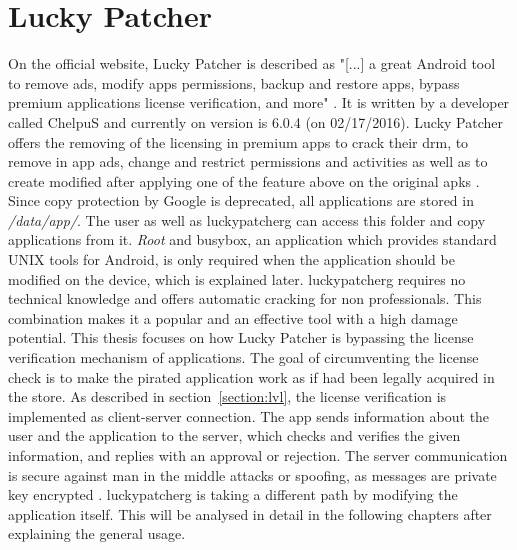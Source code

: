 \section{Lucky Patcher} \label{section:luckypatcher-explain}
 On the official website, Lucky Patcher is described as "[...] a great Android tool to remove ads, modify apps permissions, backup and restore apps, bypass premium applications license verification, and more" \cite{luckyPatcherOfficial}.
It is written by a developer called ChelpuS and currently on version is 6.0.4 (on 02/17/2016).
\newline
Lucky Patcher offers the removing of the licensing in premium apps to crack their \gls{drm}, to remove in app ads, change and restrict permissions and activities as well as to create modified after applying one of the feature above on the original \gls{apk}s \cite{luckyPatcherOfficial}.
Since copy protection by Google is deprecated, all applications are stored in \textit{/data/app/}.
The user as well as \gls{luckypatcherg} can access this folder and copy applications from it.
\textit{Root} and busybox, an application which provides standard UNIX tools for Android\cite{busyboxApp}, is only required when the application should be modified on the device, which is explained later.
\gls{luckypatcherg} requires no technical knowledge and offers automatic cracking for non professionals.
This combination makes it a popular and an effective tool with a high damage potential. \cite{munteanLicense}
\newline
This thesis focuses on how Lucky Patcher is bypassing the license verification mechanism of applications.
The goal of circumventing the license check is to make the pirated application work as if had been legally acquired in the store.
As described in section~\ref{section:lvl}, the license verification is implemented as client-server connection.
The app sends information about the user and the application to the server, which checks and verifies the given information, and replies with an approval or rejection.
The server communication is secure against man in the middle attacks or spoofing, as messages are private key encrypted \cite{munteanLicense}.
\gls{luckypatcherg} is taking a different path by modifying the application itself. This will be analysed in detail in the following chapters after explaining the general usage.
\newline
